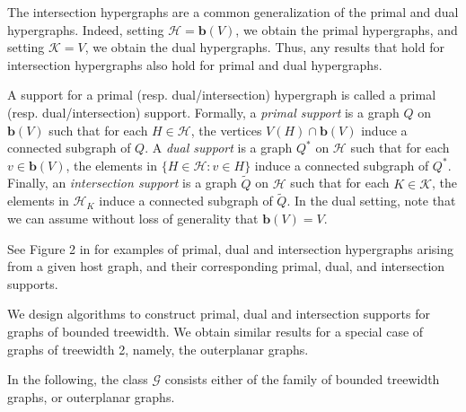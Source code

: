 \documentclass[12pt]{article}
\makeatletter
\newcommand{\GG}{\mathcal{G}}
\newcommand{\R}{\mathbf{r}}
\newcommand{\B}{\mathbf{b}}
\newcommand{\HH}{\mathcal{H}}
\newcommand{\KK}{\mathcal{K}}
\newcommand{\problemtitle}[1]{\gdef\@problemtitle{#1}}%
\newcommand{\probleminput}[1]{\gdef\@probleminput{#1}}%
\newcommand{\problemquestion}[1]{\gdef\@problemquestion{#1}}%
\theoremstyle{case}
\makeatother
\begin{document}
The intersection hypergraphs are a common generalization of the primal and dual hypergraphs.
Indeed, setting $\mathcal{H}=\B(V)$, we obtain the primal hypergraphs, and setting
$\mathcal{K}=V$, we obtain the dual hypergraphs. Thus, any results that hold for intersection
hypergraphs also hold for primal and dual hypergraphs.

A support for a primal (resp. dual/intersection) hypergraph
is called a primal (resp. dual/intersection) support.
Formally, a \emph{primal support} is a graph $Q$ on $\B(V)$ such that for each $H\in\mathcal{H}$, the vertices $V(H)\cap\B(V)$ induce a connected subgraph of $Q$.
A \emph{dual support} is a graph $Q^*$ on $\HH$ such that for each $v\in\B(V)$, the elements in $\{H\in\HH:v\in H\}$ induce a connected subgraph of $Q^*$.
Finally, an \emph{intersection support} is a graph $\tilde{Q}$ on $\HH$ such that for each $K\in\KK$, the elements in $\HH_K$ induce a connected subgraph of $\tilde{Q}$.
In the dual setting, note that we can assume without loss of generality
that $\B(V)=V$.

See Figure 2 in \cite{raman2025supportsgraphsboundedgenus} for examples of primal, dual and intersection
hypergraphs arising from a given host graph, and their corresponding primal, dual, and intersection supports.

We design algorithms to construct primal, dual
and intersection supports for graphs of bounded treewidth.
We obtain similar results for a special case of graphs of 
treewidth 2, namely, the outerplanar graphs.

In the following, the class $\mathcal{G}$ consists either of the family of bounded treewidth graphs, or outerplanar graphs.

\begin{problem}
  \problemtitle{Primal Support}
  \probleminput{A graph $G\in\GG$ with $c:V(G)\to\{\R,\B\}$, and a collection $\mathcal{H}$ of connected subgraphs of $G$.}
  \problemquestion{Is there a support $Q$ on $\B(V(G))$ such that $Q\in\GG$, i.e., $Q$ has bounded treewidth and for each $H\in\mathcal{H}$,
  $H\cap\B(V(G))$ induces a connected subgraph in $Q$?}
\end{problem}

\begin{problem}
      \problemtitle{Dual Support}
  \probleminput{A graph $G\in\GG$ and a collection $\HH$ of connected subgraphs of $G$.}
  \problemquestion{Is there a dual support $Q^*\in\GG$ on $\mathcal{H}$, i.e., for each $v\in V(G)$,
  $\{H\in\mathcal{H}: v\in H\}$ induces a connected subgraph of $Q^*$?}
\end{problem}
\end{document}
